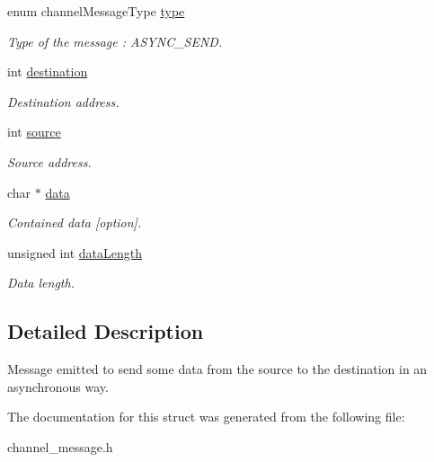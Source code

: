 \begin{DoxyCompactItemize}
\item 
\hypertarget{structchannelMessageAsyncSend_a5f2677d46fdd86e3a421bf9c8ff48c80}{enum channel\-Message\-Type \hyperlink{structchannelMessageAsyncSend_a5f2677d46fdd86e3a421bf9c8ff48c80}{type}}\label{structchannelMessageAsyncSend_a5f2677d46fdd86e3a421bf9c8ff48c80}

\begin{DoxyCompactList}\small\item\em Type of the message \-: A\-S\-Y\-N\-C\-\_\-\-S\-E\-N\-D. \end{DoxyCompactList}\item 
\hypertarget{structchannelMessageAsyncSend_a36de60ac437fd1c9075f109d32fcf148}{int \hyperlink{structchannelMessageAsyncSend_a36de60ac437fd1c9075f109d32fcf148}{destination}}\label{structchannelMessageAsyncSend_a36de60ac437fd1c9075f109d32fcf148}

\begin{DoxyCompactList}\small\item\em Destination address. \end{DoxyCompactList}\item 
\hypertarget{structchannelMessageAsyncSend_a3522df4ddca98ef49cdfa2241b8b8146}{int \hyperlink{structchannelMessageAsyncSend_a3522df4ddca98ef49cdfa2241b8b8146}{source}}\label{structchannelMessageAsyncSend_a3522df4ddca98ef49cdfa2241b8b8146}

\begin{DoxyCompactList}\small\item\em Source address. \end{DoxyCompactList}\item 
\hypertarget{structchannelMessageAsyncSend_a19784c7fd4f67d61b95256175348b650}{char $\ast$ \hyperlink{structchannelMessageAsyncSend_a19784c7fd4f67d61b95256175348b650}{data}}\label{structchannelMessageAsyncSend_a19784c7fd4f67d61b95256175348b650}

\begin{DoxyCompactList}\small\item\em Contained data \mbox{[}option\mbox{]}. \end{DoxyCompactList}\item 
\hypertarget{structchannelMessageAsyncSend_a2a6d3510cdbaee65ce5dc9cb612dbed1}{unsigned int \hyperlink{structchannelMessageAsyncSend_a2a6d3510cdbaee65ce5dc9cb612dbed1}{data\-Length}}\label{structchannelMessageAsyncSend_a2a6d3510cdbaee65ce5dc9cb612dbed1}

\begin{DoxyCompactList}\small\item\em Data length. \end{DoxyCompactList}\end{DoxyCompactItemize}


\subsection{Detailed Description}
Message emitted to send some data from the source to the destination in an asynchronous way. 

The documentation for this struct was generated from the following file\-:\begin{DoxyCompactItemize}
\item 
channel\-\_\-message.\-h\end{DoxyCompactItemize}
